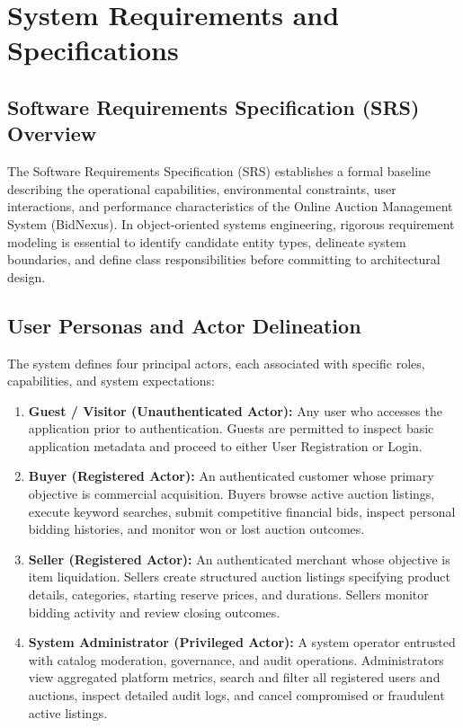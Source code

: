 \section{System Requirements and Specifications}
\label{sec:requirements}

\subsection{Software Requirements Specification (SRS) Overview}
The Software Requirements Specification (SRS) establishes a formal baseline describing the operational capabilities, environmental constraints, user interactions, and performance characteristics of the Online Auction Management System (BidNexus). In object-oriented systems engineering, rigorous requirement modeling is essential to identify candidate entity types, delineate system boundaries, and define class responsibilities before committing to architectural design.

\subsection{User Personas and Actor Delineation}
The system defines four principal actors, each associated with specific roles, capabilities, and system expectations:
\begin{enumerate}
    \item \textbf{Guest / Visitor (Unauthenticated Actor):} Any user who accesses the application prior to authentication. Guests are permitted to inspect basic application metadata and proceed to either User Registration or Login.
    \item \textbf{Buyer (Registered Actor):} An authenticated customer whose primary objective is commercial acquisition. Buyers browse active auction listings, execute keyword searches, submit competitive financial bids, inspect personal bidding histories, and monitor won or lost auction outcomes.
    \item \textbf{Seller (Registered Actor):} An authenticated merchant whose objective is item liquidation. Sellers create structured auction listings specifying product details, categories, starting reserve prices, and durations. Sellers monitor bidding activity and review closing outcomes.
    \item \textbf{System Administrator (Privileged Actor):} A system operator entrusted with catalog moderation, governance, and audit operations. Administrators view aggregated platform metrics, search and filter all registered users and auctions, inspect detailed audit logs, and cancel compromised or fraudulent active listings.
\end{enumerate}

